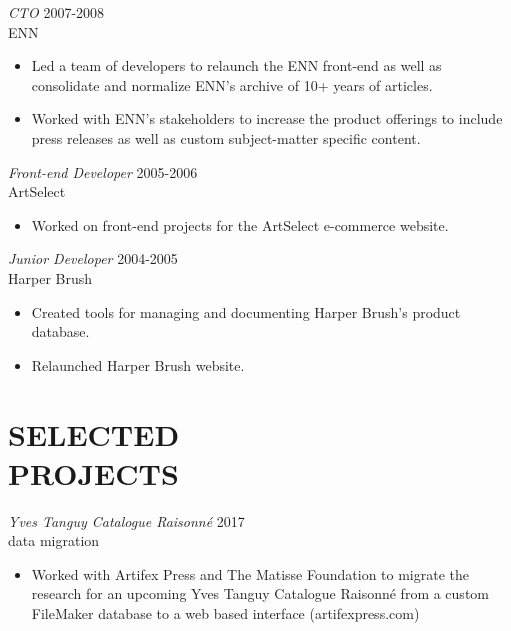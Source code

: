 \documentclass[line,margin]{res}
\begin{document}
\begin{resume}
\begin{samepage}
\begin{itemize}
    \end{itemize}
    \end{samepage}

    {\sl CTO}
    \hfill 2007-2008 \\
    ENN
    \begin{itemize} \itemsep -2pt
        \item
            Led a team of developers to relaunch the ENN front-end as well as
            consolidate and normalize ENN's archive of 10+ years of articles.

        \item
            Worked with ENN's stakeholders to increase the product offerings
            to include press releases as well as custom subject-matter
            specific content.
    \end{itemize}

    {\sl Front-end Developer}
    \hfill 2005-2006 \\
    ArtSelect
    \begin{itemize} \itemsep -2pt
        \item
            Worked on front-end projects for the ArtSelect e-commerce website.
    \end{itemize}

    {\sl Junior Developer}
    \hfill 2004-2005 \\
    Harper Brush
    \begin{itemize} \itemsep -2pt
        \item
            Created tools for managing and documenting Harper Brush's product
            database.

        \item
            Relaunched Harper Brush website.
    \end{itemize}

\section{SELECTED \\ PROJECTS}
    {\sl Yves Tanguy Catalogue Raisonné}
    \hfill 2017 \\
    data migration
    \begin{itemize} \itemsep -2pt
        \item
            Worked with Artifex Press and The Matisse Foundation to migrate the
            research for an upcoming Yves Tanguy Catalogue Raisonné from a
            custom FileMaker database to a web based interface (artifexpress.com)
    \end{itemize}


\end{resume}
\end{document}
